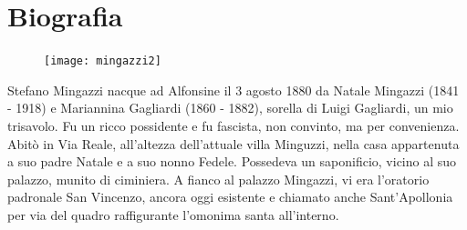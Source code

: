 \thispagestyle{empty}
\chapter*{Biografia}


\begin{figure} %
    \centering
    \vspace{-0.5cm}
    \texttt{[image: mingazzi2]}
    \caption[Stefano Mingazzi]{}
    \vspace{-0.5cm}
\end{figure}
Stefano Mingazzi nacque ad Alfonsine il 3 agosto 1880 da Natale Mingazzi (1841 - 1918) e Mariannina Gagliardi (1860 - 1882), sorella di Luigi Gagliardi, un mio trisavolo. Fu un ricco possidente e fu fascista, non convinto, ma per convenienza. Abitò in Via Reale, all'altezza dell'attuale villa Minguzzi, nella casa appartenuta a suo padre Natale e a suo nonno Fedele. Possedeva un saponificio, vicino al suo palazzo, munito di ciminiera. A fianco al palazzo Mingazzi, vi era l'oratorio padronale San Vincenzo, ancora oggi esistente e chiamato anche Sant'Apollonia per via del quadro raffigurante l'omonima santa all'interno.

